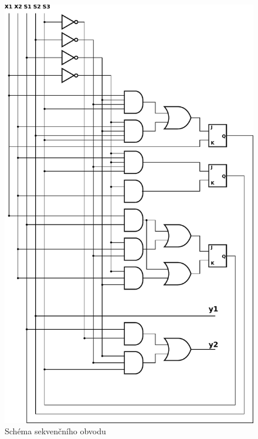 \documentclass[titlepage]{article}
\begin{document}
\clearpage
\begin{figure}[ht!]
\centering
	\includegraphics[height=.94\textheight]{obvod.pdf}
	\caption{Schéma sekvenčního obvodu}
\end{figure}
\end{document}
